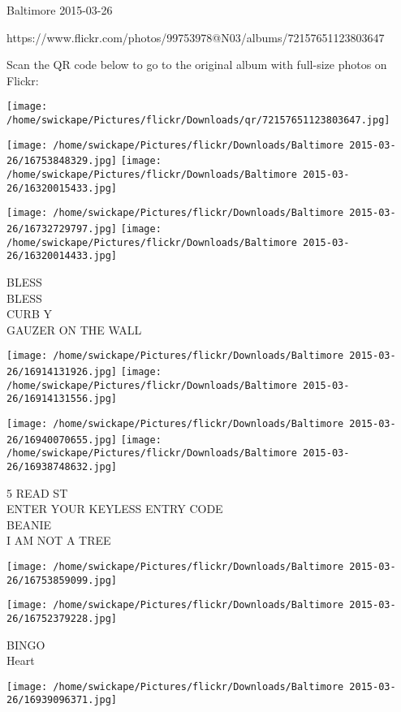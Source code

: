 \documentclass[10pt,letterpaper]{article}
\begin{document}
Baltimore 2015-03-26

https://www.flickr.com/photos/99753978@N03/albums/72157651123803647

Scan the QR code below to go to the original album with full-size photos on Flickr:

\texttt{[image: /home/swickape/Pictures/flickr/Downloads/qr/72157651123803647.jpg]}
\pagebreak

\texttt{[image: /home/swickape/Pictures/flickr/Downloads/Baltimore 2015-03-26/16753848329.jpg]}
\texttt{[image: /home/swickape/Pictures/flickr/Downloads/Baltimore 2015-03-26/16320015433.jpg]}

\texttt{[image: /home/swickape/Pictures/flickr/Downloads/Baltimore 2015-03-26/16732729797.jpg]}
\texttt{[image: /home/swickape/Pictures/flickr/Downloads/Baltimore 2015-03-26/16320014433.jpg]}

BLESS\\
BLESS\\
CURB Y\\
GAUZER ON THE WALL\\
\pagebreak

\texttt{[image: /home/swickape/Pictures/flickr/Downloads/Baltimore 2015-03-26/16914131926.jpg]}
\texttt{[image: /home/swickape/Pictures/flickr/Downloads/Baltimore 2015-03-26/16914131556.jpg]}

\texttt{[image: /home/swickape/Pictures/flickr/Downloads/Baltimore 2015-03-26/16940070655.jpg]}
\texttt{[image: /home/swickape/Pictures/flickr/Downloads/Baltimore 2015-03-26/16938748632.jpg]}

5 READ ST\\
ENTER YOUR KEYLESS ENTRY CODE\\
BEANIE\\
I AM NOT A TREE\\
\pagebreak

\texttt{[image: /home/swickape/Pictures/flickr/Downloads/Baltimore 2015-03-26/16753859099.jpg]}

\vspace{0.25in}
\texttt{[image: /home/swickape/Pictures/flickr/Downloads/Baltimore 2015-03-26/16752379228.jpg]}

BINGO\\
Heart\\
\pagebreak

\texttt{[image: /home/swickape/Pictures/flickr/Downloads/Baltimore 2015-03-26/16939096371.jpg]}
\end{document}
